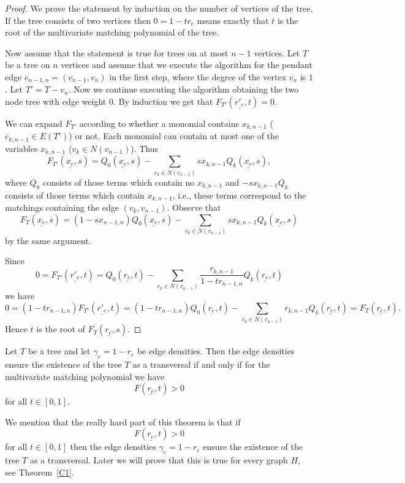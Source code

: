 \documentclass[12pt,a4paper]{amsart}
\numberwithin{equation}{section}
\begin{document}
\begin{proof} We prove the statement by induction on the number of vertices of
  the tree. If the tree consists of two vertices then $0=1-tr_e$ means exactly
  that $t$ is the root of the multivariate matching polynomial of the tree.

Now assume that the statement is true for trees on at most $n-1$ vertices. Let
$T$ be a tree on $n$ vertices and assume that we execute the algorithm for the
pendant edge $e_{n-1,n}=(v_{n-1},v_n)$ in the first step, where the degree of
the vertex $v_n$ is $1$.  Let $T'=T-v_n$. Now we continue executing the
algorithm obtaining the two node tree with edge weight $0$. By induction we get
that $F_{T'}(\underline{r'_e},t)=0$. 

We can expand $F_{T'}$ 
according to whether a monomial contains $x_{k,n-1}$ ($e_{k,n-1}\in E(T')$) or
not. Each monomial can contain at most one of the variables $x_{k,n-1}$ ($v_k\in
N(v_{n-1})$). Thus 
$$F_{T'}(\underline{x_e},s)=Q_0(\underline{x_e},s)-\sum_{v_k\in
  N(v_{n-1})}sx_{k,n-1}Q_k(\underline{x_e},s),$$
where $Q_0$ consists of those terms which contain no $x_{k,n-1}$ and
$-sx_{k,n-1}Q_k$ consists of those terms which contain $x_{k,n-1}$, i.e.,
these terms correspond to the matchings containing the edge $(v_k,v_{n-1})$.
Observe that
$$F_{T}(\underline{x_e},s)=(1-sx_{n-1,n})Q_0(\underline{x_e},s)-\sum_{v_k\in
  N(v_{n-1})}sx_{k,n-1}Q_k(\underline{x_e},s)$$
by the same argument.

Since 
$$0=F_{T'}(\underline{r'_e},t)=Q_0(
\underline{r_e},t)-\sum_{v_k\in
  N(v_{n-1})}\frac{r_{k,n-1}}{1-tr_{n-1,n}}Q_k(\underline{r_e},t)$$
we have 
$$0=(1-tr_{n-1,n})F_{T'}(\underline{r'_e},t)=(1-tr_{n-1,n})Q_0(
\underline{r_e},t)-\sum_{v_k\in
  N(v_{n-1})}r_{k,n-1}Q_k(\underline{r_e},t)=F_{T}(\underline{r_e},t).$$
Hence $t$ is the root of $F_{T}(\underline{r_e},s)$.   
\end{proof}

\begin{theorem} \label{TT2} Let $T$ be a tree and let $\gamma_e=1-r_e$ be edge
  densities. 
Then the edge densities ensure the existence of the tree $T$ as a transversal
if and only if for the multivariate matching polynomial we have
$$F(\underline{r_e},t)>0$$
for all $t\in [0,1]$.
\end{theorem}

\begin{remark} We mention that the really hard part of this theorem is that if 
$$F(\underline{r_e},t)>0$$
for all $t\in [0,1]$ then the edge densities $\gamma_e=1-r_e$ ensure the
existence of the tree $T$ as a transversal. Later we will prove that this is
true for every graph $H$, see Theorem~\ref{C1}.
\end{remark}
\end{document}
